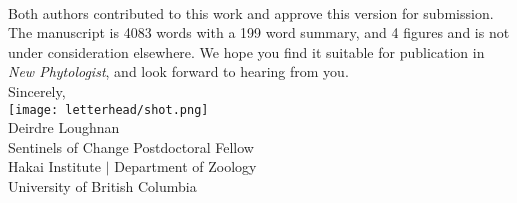 \documentclass[11pt,a4paper]{article}
\begin{document}
\vspace{1.5ex}\\
\noindent Both authors contributed to this work and approve this version for submission. The manuscript is 4083 words with a 199 word summary, and 4 figures and is not under consideration elsewhere. We hope you find it suitable for publication in \emph{New Phytologist}, and look forward to hearing from you. 
\vspace{1.5ex}\\
\noindent Sincerely, \\
\texttt{[image: letterhead/shot.png]} \\ 
\noindent Deirdre Loughnan\\
\noindent Sentinels of Change Postdoctoral Fellow\\ %
\noindent Hakai Institute $|$ Department of Zoology\\
\noindent University of British Columbia
\newpage
\vspace{-5ex}

\begingroup
\renewcommand{\section}[2]{}
% 

\endgroup
\newpage
\end{document}
